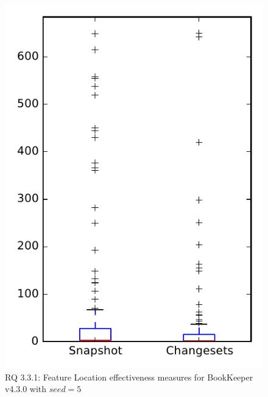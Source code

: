 
\begin{figure}
\centering
\includegraphics[height=0.4\textheight]{figures/flt_seed/rq1_bookkeeper_5}
\caption{RQ 3.3.1: Feature Location effectiveness measures for BookKeeper v4.3.0 with $seed=5$}
\label{fig:flt_seed:rq1:bookkeeper}
\end{figure}
